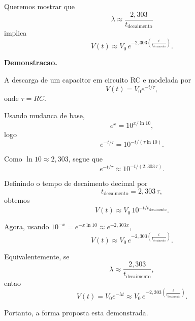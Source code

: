 Queremos mostrar que
\[
\lambda \approx \frac{2{,}303}{t_{\text{decaimento}}}
\]
implica
\[
V(t) \approx V_0\,e^{-2{,}303\left(\frac{t}{t_{\text{decaimento}}}\right)}.
\]

\textbf{Demonstracao.}

A descarga de um capacitor em circuito RC e modelada por
\[
V(t)=V_0e^{-t/\tau},
\]
onde $\tau=RC$.

Usando mudanca de base,
\[
e^x=10^{x/\ln 10},
\]
logo
\[
e^{-t/\tau}=10^{-t/(\tau\ln 10)}.
\]

Como $\ln 10\approx 2{,}303$, segue que
\[
e^{-t/\tau}\approx 10^{-t/(2{,}303\,\tau)}.
\]

Definindo o tempo de decaimento decimal por
\[
t_{\text{decaimento}}=2{,}303\,\tau,
\]
obtemos
\[
V(t)\approx V_0\,10^{-t/t_{\text{decaimento}}}.
\]

Agora, usando $10^{-x}=e^{-x\ln 10}\approx e^{-2{,}303x}$,
\[
V(t)\approx V_0\,e^{-2{,}303\left(\frac{t}{t_{\text{decaimento}}}\right)}.
\]

Equivalentemente, se
\[
\lambda\approx\frac{2{,}303}{t_{\text{decaimento}}},
\]
entao
\[
V(t)=V_0e^{-\lambda t}\approx V_0\,e^{-2{,}303\left(\frac{t}{t_{\text{decaimento}}}\right)}.
\]

Portanto, a forma proposta esta demonstrada.



